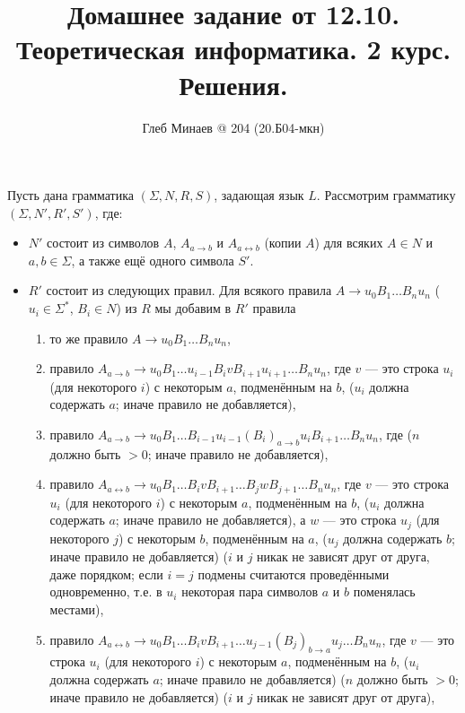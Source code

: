 \documentclass[12pt,a4paper]{article}
\title{Домашнее задание от 12.10.\\Теоретическая информатика. 2 курс.\\Решения.}
\author{Глеб Минаев @ 204 (20.Б04-мкн)}
\begin{document}
    \maketitle

    \begin{multicols}{2}
        \tableofcontents
    \end{multicols}

    \begin{problem}{4}
        Пусть дана грамматика $(\Sigma, N, R, S)$, задающая язык $L$. Рассмотрим грамматику $(\Sigma, N', R', S')$, где:
        \begin{itemize}
            \item $N'$ состоит из символов $A$, $A_{a \to b}$ и $A_{a \leftrightarrow b}$ (копии $A$) для всяких $A \in N$ и $a, b \in \Sigma$, а также ещё одного символа $S'$.
            \item $R'$ состоит из следующих правил. Для всякого правила $A \to u_0 B_1 \dots B_n u_n$ ($u_i \in \Sigma^*$, $B_i \in N$) из $R$ мы добавим в $R'$ правила
                \begin{enumerate}
                    \item то же правило $A \to u_0 B_1 \dots B_n u_n$,
                    \item правило $A_{a \to b} \to u_0 B_1 \dots u_{i-1} B_i v B_{i+1} u_{i+1} \dots B_n u_n$, где $v$ --- это строка $u_i$ (для некоторого $i$) с некоторым $a$, подменённым на $b$, ($u_i$ должна содержать $a$; иначе правило не добавляется),
                    \item правило $A_{a \to b} \to u_0 B_1 \dots B_{i-1} u_{i-1} (B_i)_{a \to b} u_i B_{i+1} \dots B_n u_n$, где ($n$ должно быть $>0$; иначе правило не добавляется),
                    \item правило $A_{a \leftrightarrow b} \to u_0 B_1 \dots B_i v B_{i+1} \dots B_j w B_{j+1} \dots B_n u_n$, где $v$ --- это строка $u_i$ (для некоторого $i$) с некоторым $a$, подменённым на $b$, ($u_i$ должна содержать $a$; иначе правило не добавляется), а $w$ --- это строка $u_j$ (для некоторого $j$) с некоторым $b$, подменённым на $a$, ($u_j$ должна содержать $b$; иначе правило не добавляется) ($i$ и $j$ никак не зависят друг от друга, даже порядком; если $i = j$ подмены считаются проведёнными одновременно, т.е. в $u_i$ некоторая пара символов $a$ и $b$ поменялась местами),
                    \item правило $A_{a \leftrightarrow b} \to u_0 B_1 \dots B_i v B_{i+1} \dots u_{j-1} (B_j)_{b \to a} u_j \dots B_n u_n$, где $v$ --- это строка $u_i$ (для некоторого $i$) с некоторым $a$, подменённым на $b$, ($u_i$ должна содержать $a$; иначе правило не добавляется) ($n$ должно быть $>0$; иначе правило не добавляется) ($i$ и $j$ никак не зависят друг от друга),

\end{enumerate}
\end{itemize}
\end{problem}
\end{document}
